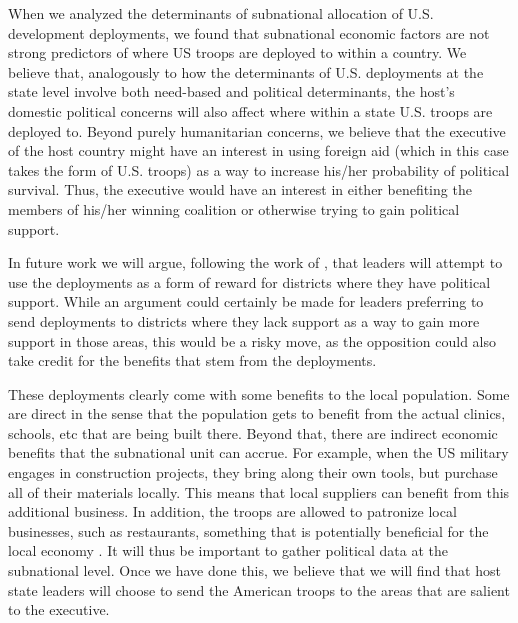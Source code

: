 \documentclass[12pt]{article}
\begin{document}
\begin{doublespace}
When we analyzed the determinants of subnational allocation of U.S. development deployments, we found that subnational economic factors are not strong predictors of where US troops are deployed to within a country.  We believe that, analogously to how the determinants of U.S. deployments at the state level involve both need-based and political determinants, the host's domestic political concerns will also affect where within a state U.S. troops are deployed to.  Beyond purely humanitarian  concerns, we believe that the executive of the host country might have an interest in using foreign aid (which in this case takes the form of U.S. troops) as a way to increase his/her probability of political survival.  Thus, the executive would have an interest  in either benefiting the members of his/her winning coalition or otherwise trying to gain political support.  

In future work we will argue, following the work of , that leaders will attempt to use the deployments as a form of reward for districts where they have political support.  While an argument could certainly be made for leaders preferring to send deployments to districts where they lack support as a way to gain more support in those areas, this would be a risky move, as the opposition could also take credit for the benefits that stem from the deployments. 

These deployments clearly come with some benefits to the local population.  Some are direct in the sense that the population gets to benefit from the actual clinics, schools, etc that are being built there.  Beyond that, there are indirect economic benefits that the subnational unit can accrue.  For example, when the US military engages in construction projects, they bring along their own tools, but purchase all of their materials locally.  This means that local suppliers can benefit from this additional business.  In addition, the troops are allowed to patronize local businesses, such as restaurants, something that is potentially beneficial for the local economy \cite{SFC20160226}.  It will thus be important to gather political data at the subnational level.  Once we have done this, we believe that we will find that  host state leaders will choose to send the American troops to the areas that are salient to the executive. 


\end{doublespace}
\end{document}
